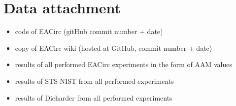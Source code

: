 \documentclass[12pt,oneside]{fithesis2}		%
\renewcommand{\_}{\leavevmode \kern0.0em\vbox{\hrule width0.4em}}
\newcommand{\squarebullet}{\textcolor{black}{\raisebox{0.15em}{\rule{4pt}{4pt}}}}
\newenvironment{myItemize}{
  \begin{itemize}[leftmargin=2em,rightmargin=1em,itemsep=\parskip ,parsep=0em,topsep=0em,partopsep=0em]
  \renewcommand{\labelitemi}{\squarebullet}
  \renewcommand{\labelitemii}{$\diamond$}
}{
  \end{itemize}
}
\begin{document}
\appendix

\nocite{*}
\printbibliography

\chapter{Data attachment}

\begin{myItemize}
\item code of EACirc (gitHub commit number + date)
\item copy of EACirc wiki (hosted at GitHub, commit number + date)
\item results of all performed EACirc experiments in the form of AAM values
\item results of STS NIST from all performed experiments
\item results of Dieharder from all performed experiments
\end{myItemize}
\end{document}
